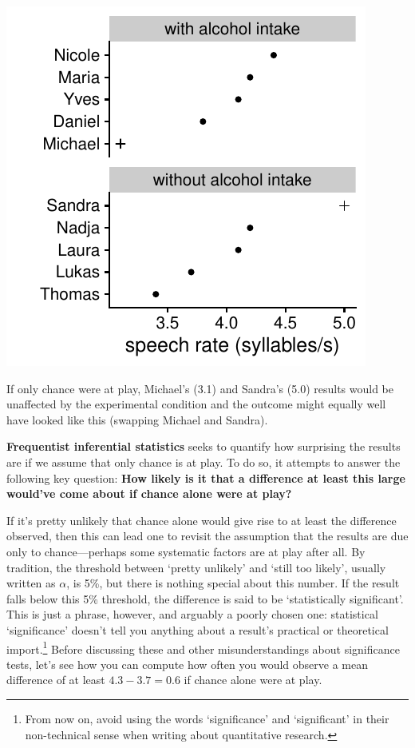 \documentclass[a4paper]{tufte-book}\usepackage[]{graphicx}\usepackage[]{xcolor}
\newcommand{\term}[1]{\textbf{#1}}
\begin{document}
\begin{marginfigure}
\includegraphics[width=\textwidth]{figure/alcohol_results_alt}
\caption{If only chance were at play, Michael's (3.1) and Sandra's (5.0) results would be unaffected by the experimental condition and the outcome might equally well have looked like this (swapping Michael and Sandra).}
\label{fig:alcohol_results_alt}
\end{marginfigure}

\term{Frequentist inferential statistics} seeks to quantify
how surprising the results are if we assume that only chance is at play.
To do so, it attempts to answer the following key question:
\textbf{How likely is it that a difference at least this large would've come about if chance alone were at play?}

If it's pretty unlikely that chance alone would give rise to at least the difference observed,
then this can lead one to revisit the assumption that the results are due
only to chance---perhaps some systematic factors are at play after all.
By tradition, the threshold between `pretty unlikely' and `still too likely',
usually written as $\alpha$, is 5\%,
but there is nothing special about this number.
If the result falls below this 5\% threshold,
the difference is said to be `statistically significant'.
This is just a phrase, however, and arguably a poorly chosen one: statistical `significance' doesn't tell you anything about a
result's practical or theoretical import.\footnote{From now on, avoid using the words `significance' and `significant' in their non-technical sense when writing about quantitative research.}
Before discussing these and other misunderstandings about significance tests,
let's see how you can compute how often you would
observe a mean difference of at least $4.3-3.7=0.6$ if chance alone were at play.
\end{document}
